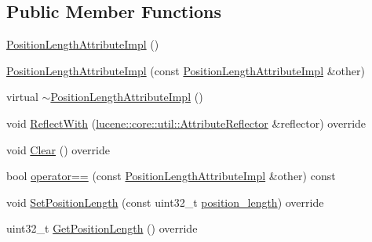 \subsection*{Public Member Functions}
\begin{DoxyCompactItemize}
\item 
\mbox{\hyperlink{classlucene_1_1core_1_1analysis_1_1tokenattributes_1_1PositionLengthAttributeImpl_afcfe707b9309054f29ab710a3414a20b}{Position\+Length\+Attribute\+Impl}} ()
\item 
\mbox{\hyperlink{classlucene_1_1core_1_1analysis_1_1tokenattributes_1_1PositionLengthAttributeImpl_a2ed9d880e9632a2e444b62a1c127e713}{Position\+Length\+Attribute\+Impl}} (const \mbox{\hyperlink{classlucene_1_1core_1_1analysis_1_1tokenattributes_1_1PositionLengthAttributeImpl}{Position\+Length\+Attribute\+Impl}} \&other)
\item 
virtual \mbox{\hyperlink{classlucene_1_1core_1_1analysis_1_1tokenattributes_1_1PositionLengthAttributeImpl_ab0cf2e31a5d40ad16b987d424344e94d}{$\sim$\+Position\+Length\+Attribute\+Impl}} ()
\item 
void \mbox{\hyperlink{classlucene_1_1core_1_1analysis_1_1tokenattributes_1_1PositionLengthAttributeImpl_aec63a5cf6bdf55b0f4c95d5b17109e5f}{Reflect\+With}} (\mbox{\hyperlink{namespacelucene_1_1core_1_1util_a7dbb701adaed055f73fb95eec83da10a}{lucene\+::core\+::util\+::\+Attribute\+Reflector}} \&reflector) override
\item 
void \mbox{\hyperlink{classlucene_1_1core_1_1analysis_1_1tokenattributes_1_1PositionLengthAttributeImpl_a0f4a9a4b9ab64ced895b8fa5b9983cbd}{Clear}} () override
\item 
bool \mbox{\hyperlink{classlucene_1_1core_1_1analysis_1_1tokenattributes_1_1PositionLengthAttributeImpl_a037d4fab2158faa6e923e78b730d0f4a}{operator==}} (const \mbox{\hyperlink{classlucene_1_1core_1_1analysis_1_1tokenattributes_1_1PositionLengthAttributeImpl}{Position\+Length\+Attribute\+Impl}} \&other) const
\item 
void \mbox{\hyperlink{classlucene_1_1core_1_1analysis_1_1tokenattributes_1_1PositionLengthAttributeImpl_a8b09235c697cf5157ca4351653fcbaf4}{Set\+Position\+Length}} (const uint32\+\_\+t \mbox{\hyperlink{classlucene_1_1core_1_1analysis_1_1tokenattributes_1_1PositionLengthAttributeImpl_a12c90fb7e49f9b4043bfc09d66ef816d}{position\+\_\+length}}) override
\item 
uint32\+\_\+t \mbox{\hyperlink{classlucene_1_1core_1_1analysis_1_1tokenattributes_1_1PositionLengthAttributeImpl_a79dfa19c547152a263d601dfaf62fe9b}{Get\+Position\+Length}} () override

\end{DoxyCompactItemize}
